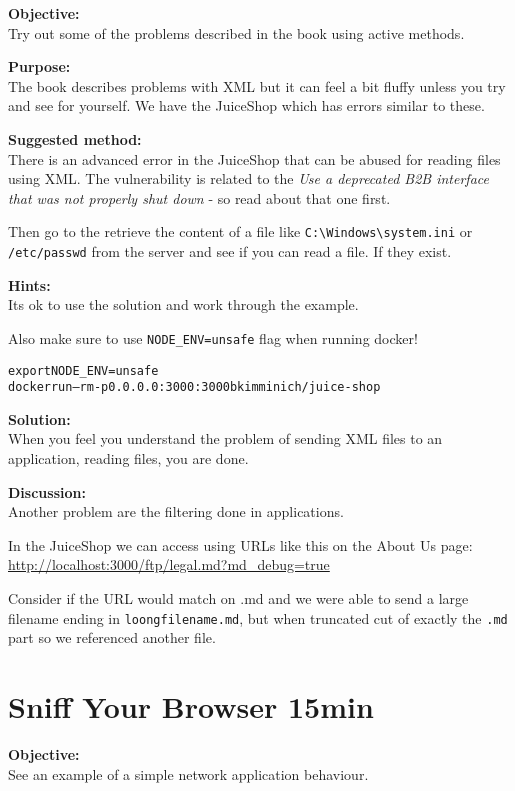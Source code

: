 \documentclass[a4paper,11pt,notitlepage]{report}
\begin{document}
{\bf Objective:}\\
Try out some of the problems described in the book using active methods.

{\bf Purpose:}\\
The book describes problems with XML but it can feel a bit fluffy unless you try and see for yourself. We have the JuiceShop which has errors similar to these.

{\bf Suggested method:}\\
There is an advanced error in the JuiceShop that can be abused for reading files using XML.
The vulnerability is related to the \emph{Use a deprecated B2B interface that was not properly shut down} - so read about that one first.

Then go to the retrieve the content of a file like \verb+C:\Windows\system.ini+ or
\verb+/etc/passwd+ from the server and see if you can read a file. If they exist.


{\bf Hints:}\\
Its ok to use the solution and work through the example.

Also make sure to use \verb+NODE_ENV=unsafe+ flag when running docker!

\begin{alltt}
export NODE_ENV=unsafe
docker run --rm -p 0.0.0.0:3000:3000 bkimminich/juice-shop
\end{alltt}

{\bf Solution:}\\
When you feel you understand the problem of sending XML files to an application, reading files, you are done.

{\bf Discussion:}\\
Another problem are the filtering done in applications.

In the JuiceShop we can access using URLs like this on the About Us page:\\
\url{http://localhost:3000/ftp/legal.md?md_debug=true}

Consider if the URL would match on .md and we were able to send a large filename ending in \verb+loongfilename.md+, but when truncated cut of exactly the \verb+.md+ part so we referenced another file.


\chapter{Sniff Your Browser 15min}
\label{ex:sniff-captive-portal}


{\bf Objective:}\\
See an example of a simple network application behaviour.
\end{document}
